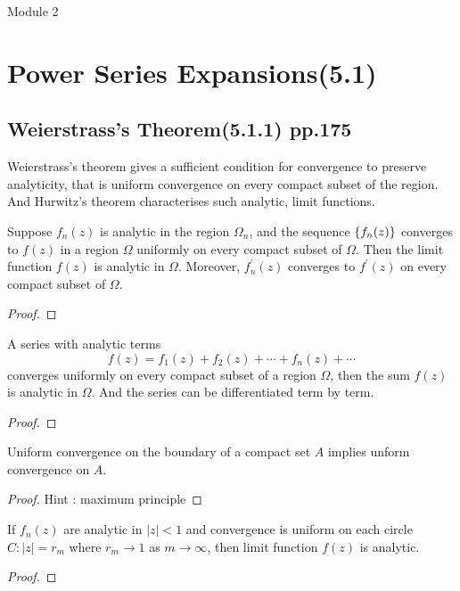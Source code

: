 \pagebreak
{\Large Module 2}
\section{Power Series Expansions(5.1)}
\subsection{Weierstrass's Theorem(5.1.1) pp.175}
\begin{important}
	Weierstrass's theorem gives a sufficient condition for convergence to preserve analyticity, that is uniform convergence on every compact subset of the region. 
	And Hurwitz's theorem characterises such analytic, limit functions.
\end{important}
\begin{theorem}[Weierstrass]
	Suppose $f_n(z)$ is analytic in the region $\Omega_n$, and the sequence $\left\{f_n(z)\right\}$ converges to $f(z)$ in a region $\Omega$ uniformly on every compact subset of $\Omega$. Then the limit function $f(z)$ is analytic in $\Omega$. Moreover, $f_n^\prime(z)$ converges to $f^\prime(z)$ on every compact subset of $\Omega$.
\end{theorem}
\begin{proof}
\end{proof}

\begin{remark}
	A series with analytic terms
	\[ f(z) = f_1(z) + f_2(z) + \dotsb + f_n(z) + \dotsb \]
	converges uniformly on every compact subset of a region $\Omega$, then the sum $f(z)$ is analytic in $\Omega$. And the series can be differentiated term by term.
\end{remark}
\begin{proof}
\end{proof}
\begin{remark}
	Uniform convergence on the boundary of a compact set $A$ implies unform convergence on $A$.
\end{remark}
\begin{proof}
	Hint : maximum principle
\end{proof}

\begin{remark}
	If $f_n(z)$ are analytic in $|z|<1$ and convergence is uniform on each circle $C : |z| = r_m$ where $r_m \to 1$ as $m \to \infty$, then limit function $f(z)$ is analytic.
\end{remark}
\begin{proof}
\end{proof}


